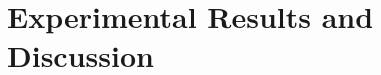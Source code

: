 \documentclass[conference]{IEEEtran}
\begin{document}



\section{Experimental Results and Discussion}
\label{sec:results}
\label{sec:analysis}
\end{document}

